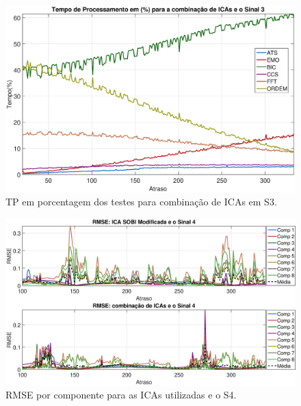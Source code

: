 \documentclass[a4paper,12pt]{monografia}
\theoremstyle{plain}
\theoremstyle{definition}
\theoremstyle{remark}
\begin{document}
\begin{figure}[!htb]
    \begin{center}
    \advance\leftskip -1.5cm
    \includegraphics[scale=0.45]{imagens/ImagensParaOAnexo/TPPACombinacaoICASinal3.eps}
    \caption{TP em porcentagem dos testes para combinação de ICAs em S3.}
    \label{fig:TPCIAS3}    
    \end{center}
\end{figure}

\begin{figure}[!htb]
    \begin{center}
    \advance\leftskip -1.5cm
    \includegraphics[scale=0.45]{imagens/ImagensParaOAnexo/RMSEcompATodasICAsSinal4.eps}
    \caption{RMSE por componente para as ICAs utilizadas e o S4.}
    \label{fig:RMSEAS4}    
    \end{center}
\end{figure}
\end{document}
